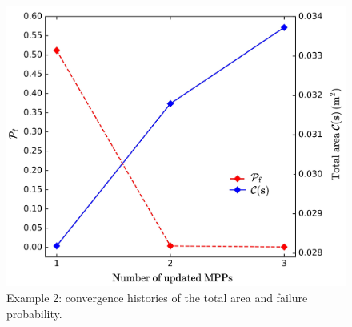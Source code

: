 \documentclass[preprint,3p]{elsarticle}
\begin{document}
\begin{linenumbers}
\begin{figure}[h!]
	\begin{center}
		\includegraphics[scale=0.7]{Fig8.jpg}
	\end{center}
	\caption{Example 2: convergence histories of the total area and failure probability.}
	\label{FIG:8}
\end{figure}


\end{linenumbers}
\end{document}
